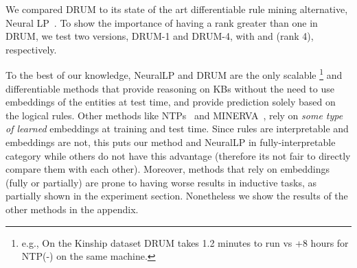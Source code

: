 \documentclass{article}
\begin{document}
\vspace{5pt}

\label{sec:drum_vs_rulemining}

We compared DRUM to its state of the art differentiable rule mining alternative, Neural LP~\cite{yang2017differentiable}. To show the importance of having a rank greater than one in DRUM, we test two versions, DRUM-1 and DRUM-4, with  and  (rank 4), respectively. 

To the best of our knowledge, NeuralLP and DRUM are the only scalable \footnote{e.g., On the Kinship dataset DRUM takes 1.2 minutes to run vs +8 hours for NTP(-) \cite{rocktaschel2017end} on the same machine.} and differentiable methods that provide reasoning on KBs without the need to use embeddings of the entities at test time, and provide prediction solely based on the logical rules. Other methods like NTPs~\cite{minervini2018towards, rocktaschel2017end} and MINERVA~\cite{das2018go}, rely on \textit{some type of learned} embeddings at training and test time. Since rules are interpretable and embeddings are not, this puts our method and NeuralLP in fully-interpretable category while others do not have this advantage (therefore its not fair to directly compare them with each other). Moreover, methods that rely on embeddings (fully or partially) are prone to having worse results in inductive tasks, as partially shown in the experiment section. Nonetheless we show the results of the other methods in the appendix.
\end{document}
